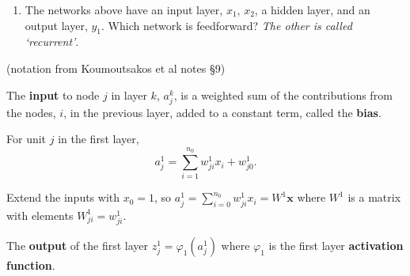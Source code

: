 \documentclass[12pt,letterpaper,noanswers]{exam}
\newcommand{\vc}[1]{\boldsymbol{#1}}
\newcommand{\note}[1]{{#1}} %
\begin{document}
\hfill

\begin{enumerate}[resume=classQ]
\item The networks above have an input layer, $x_1$, $x_2$, a hidden layer, and an output layer, $y_1$.  Which network is feedforward?  \emph{The other is called `recurrent'}.
\vspace{1cm}

\end{enumerate}

\note{
\begin{tcolorbox}
(notation from Koumoutsakos et al notes \S 9)

The \textbf{input} to node $j$ in layer $k$, $a_{j}^k$, is a weighted sum of the contributions from the nodes, $i$, in the previous layer, added to a constant term, called the \textbf{bias}. 

For unit $j$ in the first layer, \[a_j^1 = \sum\limits_{i=1}^{n_0} w_{ji}^1x_i + w_{j0}^1.\]

Extend the inputs with $x_0 = 1$, so $a_j^1 = \sum\limits_{i=0}^{n_0} w_{ji}^1x_i = W^1\vc{x}$ where $W^1$  is a matrix with elements $W^1_{ji} = w^1_{ji}$.

The \textbf{output} of the first layer $z_j^1 = \varphi_1(a_j^1)$ where $\varphi_1$ is the first layer \textbf{activation function}.
\end{tcolorbox}
}
\vspace{1in}
\end{document}
